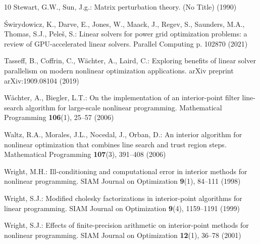 \documentclass[smallextended]{svjour3}
\begin{document}
\begin{thebibliography}{10}
Stewart, G.W., Sun, J.g.: Matrix perturbation theory.
\newblock (No Title)  (1990)

{\'S}wirydowicz, K., Darve, E., Jones, W., Maack, J., Regev, S., Saunders, M.A., Thomas, S.J., Pele{\v{s}}, S.: Linear solvers for power grid optimization problems: a review of {GPU}-accelerated linear solvers.
\newblock Parallel Computing p. 102870 (2021)

Tasseff, B., Coffrin, C., W{\"a}chter, A., Laird, C.: Exploring benefits of linear solver parallelism on modern nonlinear optimization applications.
\newblock arXiv preprint arXiv:1909.08104  (2019)

W{\"a}chter, A., Biegler, L.T.: On the implementation of an interior-point filter line-search algorithm for large-scale nonlinear programming.
\newblock Mathematical Programming \textbf{106}(1), 25--57 (2006)

Waltz, R.A., Morales, J.L., Nocedal, J., Orban, D.: An interior algorithm for nonlinear optimization that combines line search and trust region steps.
\newblock Mathematical Programming \textbf{107}(3), 391--408 (2006)

Wright, M.H.: Ill-conditioning and computational error in interior methods for nonlinear programming.
\newblock SIAM Journal on Optimization \textbf{9}(1), 84--111 (1998)

Wright, S.J.: Modified cholesky factorizations in interior-point algorithms for linear programming.
\newblock SIAM Journal on Optimization \textbf{9}(4), 1159--1191 (1999)

Wright, S.J.: Effects of finite-precision arithmetic on interior-point methods for nonlinear programming.
\newblock SIAM Journal on Optimization \textbf{12}(1), 36--78 (2001)

\end{thebibliography}
\end{document}
